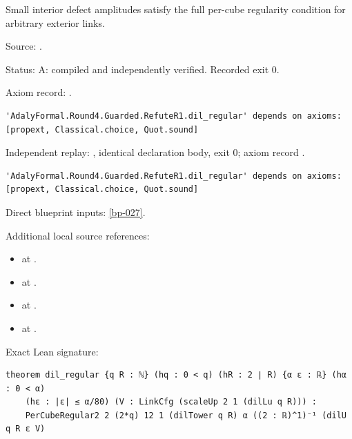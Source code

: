 \begin{theorem}[bp-032]
\label{bp-032}
\leanok
Small interior defect amplitudes satisfy the full per-cube regularity condition for arbitrary exterior links.

\par Source: \texttt{}.
\par Status: A: compiled and independently verified. Recorded exit 0.
\par Axiom record: \texttt{}.
\begin{verbatim}
'AdalyFormal.Round4.Guarded.RefuteR1.dil_regular' depends on axioms: [propext, Classical.choice, Quot.sound]
\end{verbatim}
\par Independent replay: \texttt{}, identical declaration body, exit 0; axiom record \texttt{}.
\begin{verbatim}
'AdalyFormal.Round4.Guarded.RefuteR1.dil_regular' depends on axioms: [propext, Classical.choice, Quot.sound]
\end{verbatim}
\par Direct blueprint inputs: \ref{bp-027}.
\par Additional local source references:
\begin{itemize}
\item \texttt{} at \texttt{}.
\item \texttt{} at \texttt{}.
\item \texttt{} at \texttt{}.
\item \texttt{} at \texttt{}.
\end{itemize}
\par Exact Lean signature:
\begin{verbatim}
theorem dil_regular {q R : ℕ} (hq : 0 < q) (hR : 2 ∣ R) {α ε : ℝ} (hα : 0 < α)
    (hε : |ε| ≤ α/80) (V : LinkCfg (scaleUp 2 1 (dilLu q R))) :
    PerCubeRegular2 2 (2*q) 12 1 (dilTower q R) α ((2 : ℝ)^1)⁻¹ (dilU q R ε V)
\end{verbatim}
\end{theorem}


